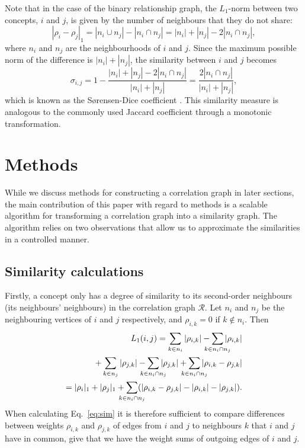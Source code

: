 \documentclass{sig-alternate}
\newcommand{\rn}[1]{\rho_{#1}}
\newcommand{\rns}[1]{|\rn{#1}|_1}
\newcommand{\sy}[1]{\sigma_{#1}}
\newcommand{\nm}[1]{L_1(#1)}
\newcommand{\dnm}[2]{|\rn{#1}-\rn{#2}|_1}
\begin{document}
Note that in the case of the binary relationship graph, the $L_1$-norm between two concepts, $i$ and $j$, is given by the number of neighbours that they do not share:
\begin{equation}
\dnm{i}{j} = |n_i \cup n_j| - |n_i \cap n_j| = |n_i| + |n_j| - 2 |n_i \cap n_j|,
\label{eq:binarynorm}
\end{equation}
where $n_i$ and $n_j$ are the neighbourhoods of $i$ and $j$. Since the maximum possible norm of the difference is $|n_i| + |n_j|$, the similarity between $i$ and $j$ becomes
\begin{equation}
\sy{i,j} = 1 - \frac{|n_i| + |n_j| - 2 |n_i \cap n_j|}{|n_i| + |n_j|} = \frac{2 |n_i \cap n_j|}{|n_i| + |n_j|},
\label{eq:binaryrelnorm}
\end{equation}
which is known as the S{\o}rensen-Dice coefficient \cite{Dice45,Sorensen48}. This similarity measure is analogous to the commonly used Jaccard coefficient \cite{Chao-2005} through a monotonic transformation.

\section{Methods}
\label{sec:methods}

While we discuss methods for constructing a correlation graph in later sections, the main contribution of this paper with
regard to methods is a scalable algorithm for transforming a correlation graph into a similarity graph. The algorithm relies on
two observations that allow us to approximate the similarities in a controlled manner.

\subsection{Similarity calculations}
\label{sec:similaritycalculations}

Firstly, a concept only has a degree of similarity to its second-order neighbours (its neighbours' neighbours) in the
correlation graph $\mathcal{R}$. Let $n_i$ and $n_j$ be the neighbouring vertices of $i$ and $j$ respectively, and $\rn{i,
k} = 0$ if $k \not\in n_i$. Then
\begin{eqnarray}
\nm{i,j}  =
\sum_{k \in n_i}  |\rn{i, k}| -  \sum_{\mathclap{k \in n_i \cap n_j}}  |\rn{i, k}| \notag\\
+  \sum_{k \in n_j}  |\rn{j, k}| -  \sum_{\mathclap{k \in n_i \cap n_j}}  |\rn{j, k}|
+  \sum_{\mathclap{k \in n_i \cap n_j}} |\rn{i, k} - \rn{j, k}| \notag\\
=  \rns{i} + \rns{j} + \sum_{\mathclap{k \in n_i \cap n_j}} (|\rn{i, k} - \rn{j, k}| - |\rn{i, k}| - |\rn{j, k}|). \label{eq:l1terms}
\end{eqnarray}
When calculating Eq.\ \ref{eq:sim} it is therefore sufficient to compare differences between weights $\rn{i, k}$ and
$\rn{j, k}$ of edges from $i$ and $j$ to neighbours $k$ that $i$ and $j$ have in common, give that we have the weight
sums of outgoing edges of $i$ and $j$.
\end{document}
